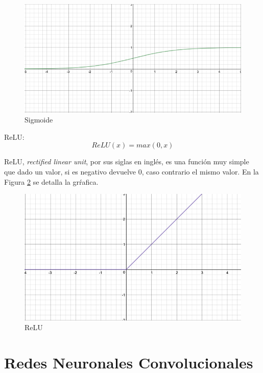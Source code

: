 \begin{figure}
\begin{center}
    \includegraphics[width=\textwidth]{images/image216.png}
    \caption{Sigmoide}
    \label{fig:sigmoid}
\end{center}
\end{figure}

ReLU:  \[ReLU(x) = max(0, x)\]

ReLU, \textit{rectified linear unit}, por sus siglas en inglés, es una función muy simple que dado un valor, si es negativo devuelve $0$, caso contrario el mismo valor. En la Figura \ref{fig:relu} se detalla la grŕafica.

\begin{figure}
\begin{center}
    \includegraphics[width=\textwidth]{images/image213.png}
    \caption{ReLU}
    \label{fig:relu}
\end{center}
\end{figure}

\section{Redes Neuronales Convolucionales}

